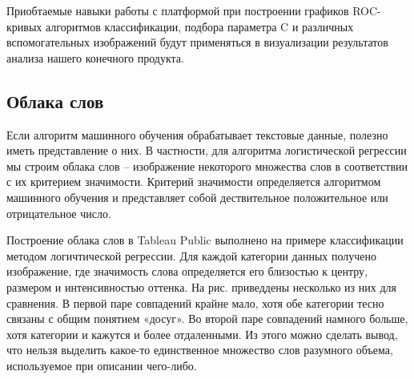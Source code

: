 \documentclass[a4paper,12pt]{article}
\begin{document}
Приобтаемые навыки работы с платформой при построении графиков ROC-кривых алгоритмов классификации, подбора параметра C и различных вспомогательных изображений будут применяться в визуализации результатов анализа нашего конечного продукта.

\subsection{Облака слов}
Если алгоритм машинного обучения обрабатывает текстовые данные, полезно иметь представление о них. В частности, для алгоритма логистической регрессии мы строим облака слов \cite{tcloud} – изображение некоторого множества слов в соответствии с их критерием значимости. Критерий значимости определяется алгоритмом машинного обучения и представляет собой дествительное положительное или отрицательное число. 

Построение облака слов в Tableau Public выполнено на примере классификации методом логичтической регрессии. Для каждой категории данных получено изображение, где значимость слова определяется его близостью к центру, размером и интенсивностью оттенка. На рис. приведдены несколько из них для сравнения. В первой паре совпадений крайне мало, хотя обе категории тесно связаны с общим понятием «досуг». Во второй паре совпадений намного больше, хотя категории и кажутся и более отдаленными. Из этого можно сделать вывод, что нельзя выделить какое-то единственное множество слов разумного объема, используемое при описании чего-либо.
\end{document}
